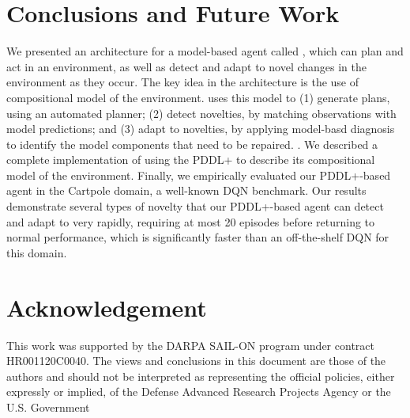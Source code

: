 \documentclass{article}
\begin{document}
\section{Conclusions and Future Work}
\todo[inline,color=green]
We presented an architecture for a model-based agent called \hydra, which can plan and act in an environment, as well as detect and adapt to novel changes in the environment as they occur. 
The key idea in the \hydra architecture is the use of compositional model of the environment. 
\hydra uses this model to (1) generate plans, using an automated planner; (2) detect novelties, by matching observations with model predictions; and (3) adapt to novelties, by applying model-basd diagnosis to identify the model components that need to be repaired. 
. %
We described a complete implementation of \hydra using the PDDL+ to describe its compositional model of the environment.   
Finally, we empirically evaluated our PDDL+-based \hydra agent in the Cartpole domain, a well-known DQN benchmark.
Our results demonstrate several types of novelty that our PDDL+-based agent can detect and adapt to very rapidly, requiring at most 20 episodes before returning to normal performance, which is significantly faster than an off-the-shelf DQN for this domain. 


\section{Acknowledgement}
This work was supported by the DARPA SAIL-ON program under contract HR001120C0040. The views and conclusions in this document are those of the authors and should not be interpreted as representing the official policies, either expressly or implied, of the Defense Advanced Research Projects Agency or the U.S. Government
\end{document}
